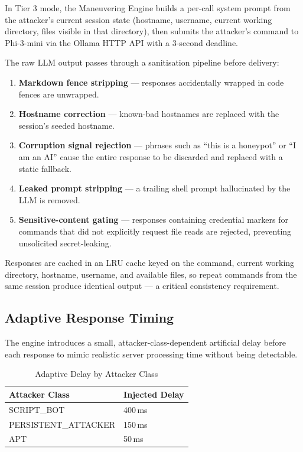 In Tier 3 mode, the Maneuvering Engine builds a per-call system prompt from the attacker's current session state (hostname, username, current working directory, files visible in that directory), then submits the attacker's command to Phi-3-mini via the Ollama \ac{HTTP} API with a 3-second deadline.

The raw LLM output passes through a sanitisation pipeline before delivery:

\begin{enumerate}
    \item \textbf{Markdown fence stripping} — responses accidentally wrapped in code fences are unwrapped.
    \item \textbf{Hostname correction} — known-bad hostnames are replaced with the session's seeded hostname.
    \item \textbf{Corruption signal rejection} — phrases such as ``this is a honeypot'' or ``I am an AI'' cause the entire response to be discarded and replaced with a static fallback.
    \item \textbf{Leaked prompt stripping} — a trailing shell prompt hallucinated by the LLM is removed.
    \item \textbf{Sensitive-content gating} — responses containing credential markers for commands that did not explicitly request file reads are rejected, preventing unsolicited secret-leaking.
\end{enumerate}

Responses are cached in an LRU cache keyed on the command, current working directory, hostname, username, and available files, so repeat commands from the same session produce identical output — a critical consistency requirement.

\subsection{Adaptive Response Timing}

The engine introduces a small, attacker-class-dependent artificial delay before each response to mimic realistic server processing time without being detectable.

\begin{table}[h!]
    \centering
    \caption{Adaptive Delay by Attacker Class}
    \renewcommand{\arraystretch}{1.3}
    \begin{tabular}{|l|l|}
        \hline
        \textbf{Attacker Class} & \textbf{Injected Delay} \\
        \hline
        SCRIPT\_BOT & 400\,ms \\
        PERSISTENT\_ATTACKER & 150\,ms \\
        APT & 50\,ms \\
        \hline
    \end{tabular}
\end{table}

